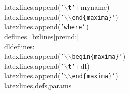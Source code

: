 {{\begin{tabbing}
\hspace{40pt}latexlines.append({\texttt{{'}$\backslash$t{'}}}+myname)
\\
\hspace{40pt}latexlines.append({\texttt{{'}$\backslash$$\backslash$end\{maxima\}{'}}})
\\
\hspace{40pt}latexlines.append({\texttt{{'}where{'}}})
\\
\hspace{40pt}deflines=bzlines{[}preind:{]}
\\
\hspace{5pt}dl\hspace{5pt}deflines:
\\
\hspace{60pt}latexlines.append({\texttt{{'}$\backslash$$\backslash$begin\{maxima\}{'}}})
\\
\hspace{60pt}latexlines.append({\texttt{{'}$\backslash$t{'}}}+dl)
\\
\hspace{60pt}latexlines.append({\texttt{{'}$\backslash$$\backslash$end\{maxima\}{'}}})
\\
\hspace{5pt}latexlines,\hspace{5pt}defs,\hspace{5pt}params
\\


\end{tabbing}}}
